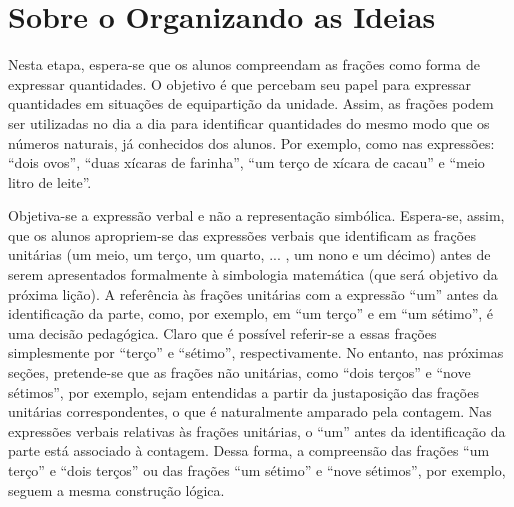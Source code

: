 \section{Sobre o Organizando as Ideias}

Nesta etapa, espera-se que os alunos compreendam as frações como forma de expressar quantidades. O objetivo é que percebam seu papel para expressar quantidades em situações de equipartição da unidade. Assim, as frações podem ser utilizadas no dia a dia para identificar quantidades do mesmo modo que os números naturais, já conhecidos dos alunos. Por exemplo, como nas expressões:   ``dois ovos'',   ``duas xícaras de farinha'',   ``um terço de xícara de cacau'' e   ``meio litro de leite''.

Objetiva-se a expressão verbal e não a representação simbólica. Espera-se, assim, que os alunos apropriem-se das expressões verbais que identificam as frações unitárias (um meio, um terço, um quarto, ... , um nono e um décimo) antes de serem apresentados formalmente à simbologia matemática (que será objetivo da próxima lição).  A referência às frações unitárias com a expressão   ``um'' antes da identificação da parte, como, por exemplo, em   ``um terço'' e em   ``um sétimo'', é uma decisão pedagógica. Claro que é possível referir-se a essas frações simplesmente por   ``terço'' e   ``sétimo'', respectivamente. No entanto, nas próximas seções, pretende-se que as frações não unitárias, como   ``dois terços'' e ``nove sétimos'', por exemplo, sejam entendidas a partir da justaposição das frações unitárias correspondentes, o que é naturalmente amparado pela contagem. Nas expressões verbais relativas às frações unitárias, o   ``um'' antes da identificação da parte está associado à contagem. Dessa forma, a compreensão das frações   ``um terço'' e   ``dois terços'' ou das frações ``um sétimo'' e ``nove sétimos'', por exemplo, seguem a mesma construção lógica.

\anotacoes

